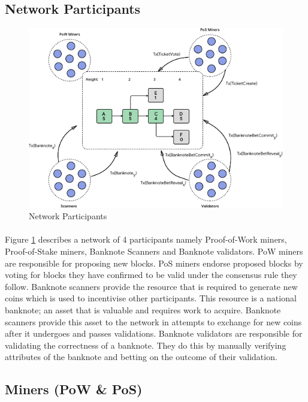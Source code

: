 \subsection{Network Participants}

\begin{figure}[H]
  \includegraphics[width=\linewidth]{images/fig1}
  \caption{Network Participants}
  \label{fig:netpat}
\end{figure}
\vspace{3mm}

\paragraph{}{
Figure \ref{fig:netpat} describes a network of 4 participants namely Proof-of-Work miners, Proof-of-Stake miners, Banknote Scanners and Banknote validators. PoW miners are responsible for proposing new blocks. PoS miners endorse proposed blocks by voting for blocks they have confirmed to be valid under the consensus rule they follow. Banknote scanners provide the resource that is required to generate new coins which is used to incentivise other participants. This resource is a national banknote; an asset that is valuable and requires work to acquire. Banknote scanners provide this asset to the network in attempts to exchange for new coins after it undergoes and passes validations. Banknote validators are responsible for validating the correctness of a banknote. They do this by manually verifying attributes of the banknote and betting on the outcome of their validation. 
}


\subsection{Miners (PoW \& PoS)} 
